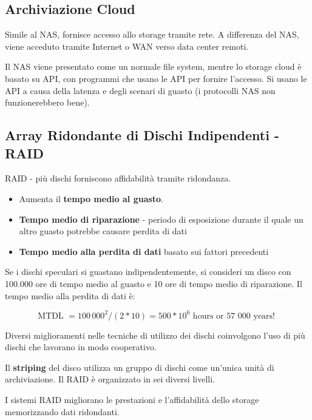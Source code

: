 \subsection{Archiviazione Cloud}

Simile al NAS, fornisce accesso allo storage tramite rete. A differenza del NAS, viene acceduto tramite Internet o WAN verso data center remoti.

Il NAS viene presentato come un normale file system, mentre lo storage cloud è basato su API, con programmi che usano le API per fornire l'accesso. Si usano le API a causa della latenza e degli scenari di guasto (i protocolli NAS non funzionerebbero bene).

\subsection{Array Ridondante di Dischi Indipendenti - RAID}

RAID - più dischi forniscono affidabilità tramite ridondanza. 

\begin{itemize}
    \item Aumenta il \textbf{tempo medio al guasto}.
    \item \textbf{Tempo medio di riparazione} - periodo di esposizione durante il quale un altro guasto potrebbe causare perdita di dati
    \item \textbf{Tempo medio alla perdita di dati} basato sui fattori precedenti
\end{itemize}


Se i dischi speculari si guastano indipendentemente, si consideri un disco con 100.000 ore di tempo medio al guasto e 10 ore di tempo medio di riparazione. Il tempo medio alla perdita di dati è:

\begin{equation*}
    \text{MTDL } = 100\,000^2 / (2*10) = 500 * 10^6 \text{ hours or 57 000 years! }   
\end{equation*}

Diversi miglioramenti nelle tecniche di utilizzo dei dischi coinvolgono l'uso di
più dischi che lavorano in modo cooperativo.

\newpage

Il \textbf{striping} del disco utilizza un gruppo di dischi come un'unica unità di archiviazione. Il RAID è organizzato in sei diversi livelli.

I sistemi RAID migliorano le prestazioni e l'affidabilità dello storage memorizzando dati ridondanti.


